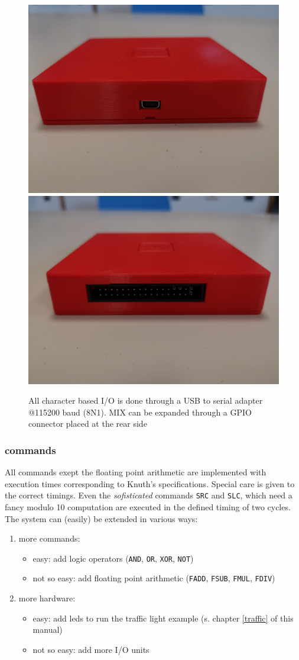 \documentclass[a4paper,ngerman]{scrartcl}
\begin{document}
\begin{figure}[H]
	\centering
	\includegraphics[width=0.4\linewidth]{../MIX_usb.jpg}
	\includegraphics[width=0.4\linewidth]{../MIX_gpio.jpg}
	
	\caption{All character based I/O is done through a USB to serial adapter @115200 baud (8N1). MIX can be expanded through a GPIO connector placed at the rear side }
	\label{fig:mixusb}
\end{figure}



\subsubsection{commands}
All commands exept the floating point arithmetic are implemented with execution times corresponding to Knuth's specifications. Special care is given to the correct timings. Even the \textit{sofisticated} commands \lstinline|SRC| and \lstinline|SLC|, which need a fancy modulo 10 computation are executed in the defined timing of two cycles. The system can (easily) be extended in various ways:

\begin{enumerate}
	\item more commands:
	\begin{itemize}
		\item easy: add logic operators (\lstinline|AND|, \lstinline|OR|, \lstinline|XOR|, \lstinline|NOT|)
		\item not so easy: add floating point arithmetic (\lstinline|FADD|, \lstinline|FSUB|, \lstinline|FMUL|, \lstinline|FDIV|)
		
	\end{itemize}
	\item  more hardware:
	\begin{itemize}
		\item easy: add leds to run the traffic light example (s. chapter \ref{traffic} of this manual)
		\item not so easy: add more I/O units
	\end{itemize}
	

\end{enumerate}
\end{document}

